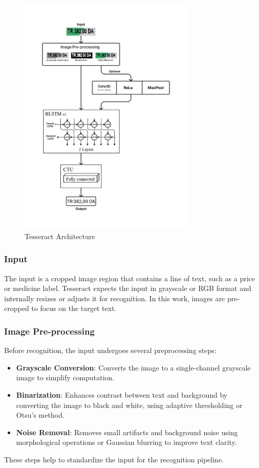 \begin{figure}[tb!]
    \centering
    \includegraphics[width=0.75\textwidth]{Figures/Chapter 3/Tesseract_Architecture.png}
    \caption{Tesseract Architecture}
    \label{fig:TesseractArchitecture}
\end{figure}


\subsubsection*{Input}
The input is a cropped image region that contains a line of text, such as a price or medicine label. Tesseract expects the input in grayscale or RGB format and internally resizes or adjusts it for recognition. In this work, images are pre-cropped to focus on the target text.

\subsubsection*{Image Pre-processing}
Before recognition, the input undergoes several preprocessing steps:
\begin{itemize}
    \item \textbf{Grayscale Conversion}: Converts the image to a single-channel grayscale image to simplify computation.
    \item \textbf{Binarization}: Enhances contrast between text and background by converting the image to black and white, using adaptive thresholding or Otsu's method.
    \item \textbf{Noise Removal}: Removes small artifacts and background noise using morphological operations or Gaussian blurring to improve text clarity.
\end{itemize}
These steps help to standardize the input for the recognition pipeline.

